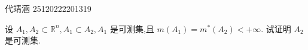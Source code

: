 \documentclass[../main.tex]{subfiles}
\begin{document}
\ifSubfilesClassLoaded{

    
    \setcounter{chapter}{1}
    \setcounter{section}{2}
}{}

\chapter{ }
\section{}
 代靖涵 25120222201319
\begin{exercise}{}{}
设 $A_1,A_2\subset\mathbb{R}^n,A_1\subset A_2,A_1$ 是可测集,且 $m(A_1)=m^*(A_2)<+\infty$. 试证明 $A_2$ 是可测集.
\end{exercise}
\end{document}

